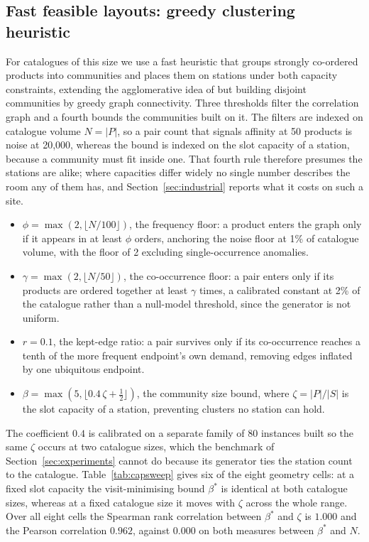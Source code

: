 \documentclass[]{interact}
\begin{document}
\subsection{Fast feasible layouts: greedy clustering heuristic}\label{sec:heuristic}
For catalogues of this size we use a fast heuristic that groups strongly co-ordered products into communities and places them on stations under both capacity constraints, extending the agglomerative idea of \citet{chuang2016} but building disjoint communities by greedy graph connectivity. Three thresholds filter the correlation graph and a fourth bounds the communities built on it. The filters are indexed on catalogue volume $N=|P|$, so a pair count that signals affinity at 50 products is noise at 20,000, whereas the bound is indexed on the slot capacity of a station, because a community must fit inside one. That fourth rule therefore presumes the stations are alike; where capacities differ widely no single number describes the room any of them has, and Section~\ref{sec:industrial} reports what it costs on such a site.
\begin{itemize}
\item $\phi=\max(2,\lfloor N/100\rfloor)$, the frequency floor: a product enters the graph only if it appears in at least $\phi$ orders, anchoring the noise floor at 1\% of catalogue volume, with the floor of 2 excluding single-occurrence anomalies.
\item $\gamma=\max(2,\lfloor N/50\rfloor)$, the co-occurrence floor: a pair enters only if its products are ordered together at least $\gamma$ times, a calibrated constant at 2\% of the catalogue rather than a null-model threshold, since the generator is not uniform.
\item $r=0.1$, the kept-edge ratio: a pair survives only if its co-occurrence reaches a tenth of the more frequent endpoint's own demand, removing edges inflated by one ubiquitous endpoint.
\item $\beta=\max\!\left(5,\big\lfloor 0.4\,\zeta+\tfrac12 \big\rfloor\right)$, the community size bound, where $\zeta=|P|/|S|$ is the slot capacity of a station, preventing clusters no station can hold.
\end{itemize}
The coefficient $0.4$ is calibrated on a separate family of 80 instances built so the same $\zeta$ occurs at two catalogue sizes, which the benchmark of Section~\ref{sec:experiments} cannot do because its generator ties the station count to the catalogue. Table~\ref{tab:capsweep} gives six of the eight geometry cells: at a fixed slot capacity the visit-minimising bound $\beta^\ast$ is identical at both catalogue sizes, whereas at a fixed catalogue size it moves with $\zeta$ across the whole range. Over all eight cells the Spearman rank correlation between $\beta^\ast$ and $\zeta$ is $1.000$ and the Pearson correlation $0.962$, against $0.000$ on both measures between $\beta^\ast$ and $N$.
\end{document}
